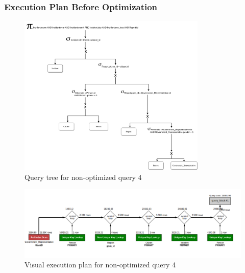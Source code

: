 \subsubsection{Execution Plan Before Optimization}
\begin{figure}[H]
    \centering
    \includegraphics[width=0.8\textwidth]{images/query_trees/query4-non-optimized.png}
    \caption{Query tree for non-optimized query 4}
\end{figure}
\begin{figure}[H]
    \centering
    \includegraphics[width=\textwidth]{images/execution_plans/q4-1-old.png}
    \caption{Visual execution plan for non-optimized query 4}
\end{figure}


